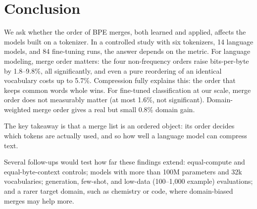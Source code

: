 \section{Conclusion}
\label{sec:conclusion}

We ask whether the order of BPE merges, both learned and applied, affects the models built on a tokenizer.
In a controlled study with six tokenizers, 14 language models, and 84 fine-tuning runs, the answer depends on the metric.
For language modeling, merge order matters: the four non-frequency orders raise bits-per-byte by 1.8--9.8\%, all significantly, and even a pure reordering of an identical vocabulary costs up to 5.7\%.
Compression fully explains this: the order that keeps common words whole wins.
For fine-tuned classification at our scale, merge order does not measurably matter (at most 1.6\%, not significant).
Domain-weighted merge order gives a real but small 0.8\% domain gain.

The key takeaway is that a merge list is an ordered object: its order decides which tokens are actually used, and so how well a language model can compress text.

Several follow-ups would test how far these findings extend:
equal-compute and equal-byte-context controls;
models with more than 100M parameters and 32k vocabularies;
generation, few-shot, and low-data (100--1,000 example) evaluations;
and a rarer target domain, such as chemistry or code, where domain-biased merges may help more.
